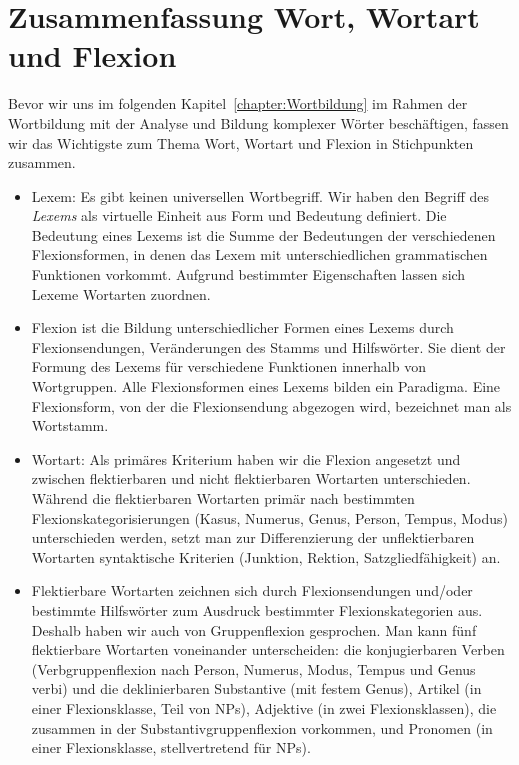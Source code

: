 \section{Zusammenfassung Wort, Wortart und Flexion}\label{section:Zfsg_Wort}

Bevor wir uns im folgenden Kapitel~\ref{chapter:Wortbildung} im Rahmen der Wortbildung mit der Analyse und Bildung komplexer Wörter beschäftigen, fassen wir das Wichtigste zum Thema Wort, Wortart und Flexion in Stichpunkten zusammen. 
 
\begin{itemize}

\item Lexem: Es gibt keinen universellen Wortbegriff. Wir haben den Begriff des \textit{Lexems} als virtuelle Einheit aus Form und Bedeutung definiert. Die Bedeutung eines Lexems ist die Summe der Bedeutungen der verschiedenen Flexionsformen, in denen das Lexem mit unterschiedlichen grammatischen Funktionen vorkommt. Aufgrund bestimmter Eigenschaften lassen sich Lexeme Wortarten zuordnen. 

\item Flexion ist die Bildung unterschiedlicher Formen eines Lexems durch Flexionsendungen, Veränderungen des Stamms und Hilfswörter. Sie dient der Formung des Lexems für verschiedene Funktionen innerhalb von Wortgruppen. Alle Flexionsformen eines Lexems bilden ein Paradigma. Eine Flexionsform, von der die Flexionsendung abgezogen wird, bezeichnet man als Wortstamm.

\item Wortart: Als primäres Kriterium haben wir die Flexion angesetzt und zwischen flektierbaren und nicht flektierbaren Wortarten unterschieden. Während die flektierbaren Wortarten primär nach bestimmten Flexionskategorisierungen (Kasus, Numerus, Genus, Person, Tempus, Modus) unterschieden werden, setzt man zur Differenzierung der unflektierbaren Wortarten syntaktische Kriterien (Junktion, Rektion, Satzgliedfähigkeit) an.

\item Flektierbare Wortarten zeichnen sich durch Flexionsendungen und/oder bestimmte Hilfswörter zum Ausdruck bestimmter Flexionskategorien aus. Deshalb haben wir auch von Gruppenflexion gesprochen. Man kann fünf flektierbare Wortarten voneinander unterscheiden: die konjugierbaren Verben (Verbgruppenflexion nach Person, Numerus, Modus, Tempus und Genus verbi) und die deklinierbaren Substantive (mit festem Genus), Artikel (in einer Flexionsklasse, Teil von NPs), Adjektive (in zwei Flexionsklassen), die zusammen in der Substantivgruppenflexion vorkommen, und Pronomen (in einer Flexionsklasse, stellvertretend für NPs). 


\end{itemize}
